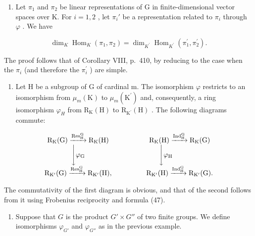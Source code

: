 \begin{enumerate}
\def\labelenumi{\arabic{enumi})}
\setcounter{enumi}{2}
\tightlist
\item
  Let \(\pi_1\) and \(\pi_2\) be linear representations of G in finite-dimensional vector spaces over K. For \(i = 1,2\) , let \(\pi_i'\) be a representation related to \(\pi_i\) through \(\varphi\) . We have
\end{enumerate}

\[
\dim_ {K} \operatorname{Hom} _ {K} (\pi_ {1}, \pi_ {2}) = \dim_ {K ^ {\prime}} \operatorname{Hom} _ {K ^ {\prime}} (\pi_ {1} ^ {\prime}, \pi_ {2} ^ {\prime}).\tag{47}
\]

The proof follows that of Corollary VIII, p.~410, by reducing to the case when the \(\pi_{i}\) (and therefore the \(\pi_{i}^{\prime}\) ) are simple.

\begin{enumerate}
\def\labelenumi{\arabic{enumi})}
\setcounter{enumi}{3}
\tightlist
\item
  Let H be a subgroup of G of cardinal m. The isomorphism \(\varphi\) restricts to an isomorphism from \(\mu_{m}(\mathrm{K})\) to \(\mu_{m}(\mathrm{K}^{\prime})\) and, consequently, a ring isomorphism \(\varphi_{H}\) from \(\mathrm{R}_{\mathrm{K}}(\mathrm{H})\) to \(\mathrm{R}_{\mathrm{K}^{\prime}}(\mathrm{H})\) . The following diagrams commute:
\end{enumerate}

\[
\begin{array}{c c} \mathrm {R_ {K} (G)} \xrightarrow {\mathrm {Res_ {H} ^ {G}}} \mathrm {R_ {K} (H)} & \qquad \qquad \mathrm {R_ {K} (H)} \xrightarrow {\mathrm {Ind_ {H} ^ {G}}} \mathrm {R_ {K} (G)} \\ \Biggl \downarrow \varphi_ {\mathrm{G}} & \Biggl \downarrow \varphi_ {\mathrm{H}} \\ \mathrm {R_ {K^ {\prime}} (G)} \xrightarrow {\mathrm {Res_ {H} ^ {G}}} \mathrm {R_ {K^ {\prime}} (H)}, & \qquad \qquad \mathrm {R_ {K^ {\prime}} (H)} \xrightarrow {\mathrm {Ind_ {H} ^ {G}}} \mathrm {R_ {K^ {\prime}} (G)}. \end{array}
\]

The commutativity of the first diagram is obvious, and that of the second follows from it using Frobenius reciprocity and formula (47).

\begin{enumerate}
\def\labelenumi{\arabic{enumi})}
\setcounter{enumi}{4}
\tightlist
\item
  Suppose that \(G\) is the product \(G' \times G''\) of two finite groups. We define isomorphisms \(\varphi_{G'}\) and \(\varphi_{G''}\) as in the previous example.
\end{enumerate}

